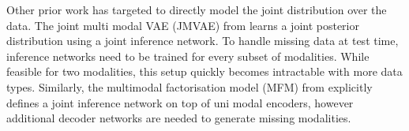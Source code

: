 Other prior work has targeted to directly model the joint distribution over the data.
The joint multi modal VAE (JMVAE) from \cite{suzuki2016joint} learns a joint posterior distribution using a joint inference network.
To handle missing data at test time, inference networks need to be trained for every subset of modalities.
While feasible for two modalities, this setup quickly becomes intractable with more data types.
Similarly, the multimodal factorisation model (MFM) from \cite{tsai2018learning} explicitly defines a joint inference network on top of uni modal encoders, however additional decoder networks are needed to generate missing modalities.



